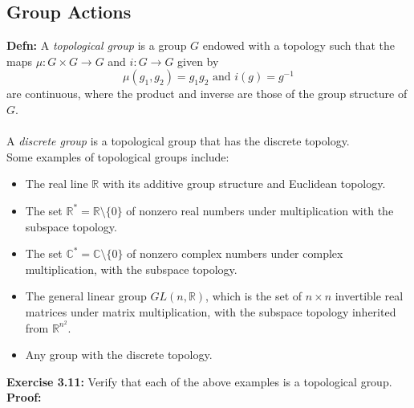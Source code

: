 \documentclass{article}
\begin{document}
  \subsection{Group Actions}
  \textbf{Defn:} A \textit{topological group} is a group \(G\) endowed with a topology such that the maps \(\mu:G\times G\to G\) and \(i:G\to G\) given by \[
  \mu(g_1,g_2)=g_1g_2 \text{ and } i(g)=g^{-1}
  \] are continuous, where the product and inverse are those of the group structure of \(G\).\\
  \\
  A \textit{discrete group} is a topological group that has the discrete topology.\\
  Some examples of topological groups include:
  \begin{itemize}
      \item The real line \(\mathbb{R}\) with its additive group structure and Euclidean topology.
      \item The set \(\mathbb{R}^* =\mathbb{R}\setminus \{0\}\) of nonzero real numbers under multiplication with the subspace topology.
      \item The set \(\mathbb{C}^*=\mathbb{C}\setminus\{0\}\) of nonzero complex numbers under complex multiplication, with the subspace topology.
      \item The general linear group \(GL(n,\mathbb{R})\), which is the set of \(n\times n\) invertible real matrices under matrix multiplication, with the subspace topology inherited from \(\mathbb{R}^{n^2}\).
      \item Any group with the discrete topology.
  \end{itemize}
  \textbf{Exercise 3.11:} Verify that each of the above examples is a topological group.\\
  \textbf{Proof:}
\end{document}
